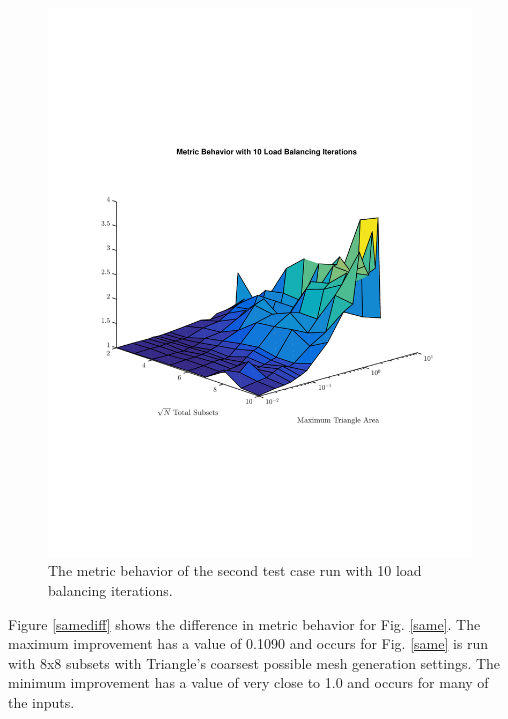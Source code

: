 \documentclass{anstrans}
\begin{document}
\begin{figure}
\centering
\includegraphics[scale=0.5, trim = 2cm 5cm 0cm 5cm,clip]{figures/SameIter.pdf}
\caption{The metric behavior of the second test case run with 10 load balancing iterations.}
\label{sameiter}
\end{figure}

Figure \ref{samediff} shows the difference in metric behavior for Fig. \ref{same}. The maximum improvement has a value of 0.1090 and occurs for Fig. \ref{same} is run with 8x8 subsets with Triangle's coarsest possible mesh generation settings. The minimum improvement has a value of very close to 1.0 and occurs for many of the inputs. 
\end{document}
